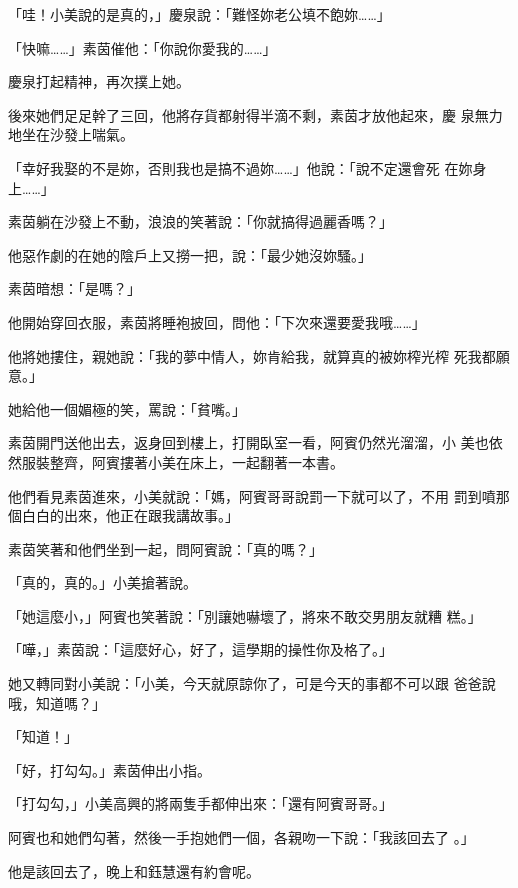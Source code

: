 「哇！小美說的是真的，」慶泉說：「難怪妳老公填不飽妳……」

「快嘛……」素茵催他：「你說你愛我的……」

慶泉打起精神，再次撲上她。

後來她們足足幹了三回，他將存貨都射得半滴不剩，素茵才放他起來，慶
泉無力地坐在沙發上喘氣。

「幸好我娶的不是妳，否則我也是搞不過妳……」他說：「說不定還會死
在妳身上……」

素茵躺在沙發上不動，浪浪的笑著說：「你就搞得過麗香嗎？」

他惡作劇的在她的陰戶上又撈一把，說：「最少她沒妳騷。」

素茵暗想：「是嗎？」

他開始穿回衣服，素茵將睡袍披回，問他：「下次來還要愛我哦……」

他將她摟住，親她說：「我的夢中情人，妳肯給我，就算真的被妳榨光榨
死我都願意。」

她給他一個媚極的笑，罵說：「貧嘴。」

素茵開門送他出去，返身回到樓上，打開臥室一看，阿賓仍然光溜溜，小
美也依然服裝整齊，阿賓摟著小美在床上，一起翻著一本書。

他們看見素茵進來，小美就說：「媽，阿賓哥哥說罰一下就可以了，不用
罰到噴那個白白的出來，他正在跟我講故事。」

素茵笑著和他們坐到一起，問阿賓說：「真的嗎？」

「真的，真的。」小美搶著說。

「她這麼小，」阿賓也笑著說：「別讓她嚇壞了，將來不敢交男朋友就糟
糕。」

「嘩，」素茵說：「這麼好心，好了，這學期的操性你及格了。」

她又轉同對小美說：「小美，今天就原諒你了，可是今天的事都不可以跟
爸爸說哦，知道嗎？」

「知道！」

「好，打勾勾。」素茵伸出小指。

「打勾勾，」小美高興的將兩隻手都伸出來：「還有阿賓哥哥。」

阿賓也和她們勾著，然後一手抱她們一個，各親吻一下說：「我該回去了
。」

他是該回去了，晚上和鈺慧還有約會呢。










